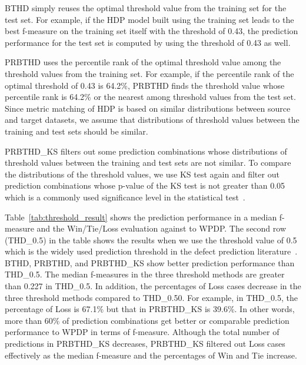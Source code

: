 BTHD simply reuses the optimal threshold value from the training set for the test set. For example, if the HDP model built using the training set leads to the best f-measure on the training set itself with the threshold of 0.43, the prediction performance for the test set is computed by using the threshold of 0.43 as well.

PRBTHD uses the percentile rank of the optimal threshold value among the threshold values from the training set.  For example, if the percentile rank of the optimal threshold of 0.43 is 64.2\%, PRBTHD finds the threshold value whose percentile rank is 64.2\% or the nearest among threshold values from the test set. Since metric matching of HDP is based on similar distributions between source and target datasets, we assume that distributions of threshold values between the training and test sets should be similar.

PRBTHD\_KS filters out some prediction combinations whose distributions of threshold values between the training and test sets are not similar. To compare the distributions of the threshold values, we use KS test again and filter out prediction combinations whose p-value of the KS test is not greater than 0.05 which is a commonly used significance level in the
statistical test~\cite{Corder09}.

Table~\ref{tab:threshold_result} shows the prediction performance in a median f-measure and the Win/Tie/Loss evaluation against to WPDP. The second row (THD\_0.5) in the table shows the results when we use the threshold value of 0.5 which is the widely used prediction threshold in the defect prediction literature~\cite{Lee11,Rahman13,Herzig13,Zimmermann09}. BTHD, PRBTHD, and PRBTHD\_KS show better prediction performance than THD\_0.5. The median f-measures in the three threshold methods are greater than 0.227 in THD\_0.5. In addition, the percentages of Loss cases decrease in the three threshold methods compared to THD\_0.50. For example, in THD\_0.5, the percentage of Loss is 67.1\% but that in PRBTHD\_KS is 39.6\%. In other words, more than 60\% of prediction combinations get better or comparable prediction performance to WPDP in terms of f-measure. Although the total number of predictions in PRBTHD\_KS decreases, PRBTHD\_KS filtered out Loss cases effectively as the median f-measure and the percentages of Win and Tie increase.

